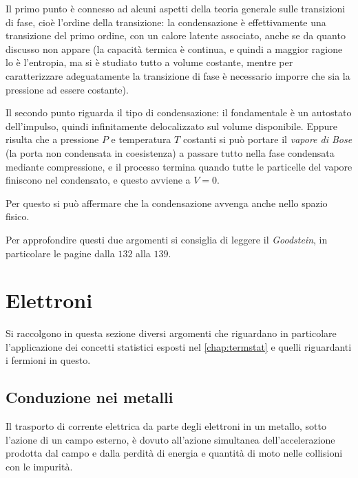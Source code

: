 Il primo punto è connesso ad alcuni aspetti della teoria generale sulle transizioni di fase, cioè l'ordine della transizione: la condensazione è effettivamente una transizione del primo ordine, con un calore latente associato, anche se da quanto discusso non appare (la capacità termica è continua, e quindi a maggior ragione lo è l'entropia, ma si è studiato tutto a volume costante, mentre per caratterizzare adeguatamente la transizione di fase è necessario imporre che sia la pressione ad essere costante).
\newline

Il secondo punto riguarda il tipo di condensazione: il fondamentale è un autostato dell'impulso, quindi infinitamente delocalizzato sul volume disponibile. Eppure risulta che a pressione $ P $ e temperatura $ T $ costanti si può portare il \textit{vapore di Bose} (la porta non condensata in coesistenza) a passare tutto nella fase condensata mediante compressione, e il processo termina quando tutte le particelle del vapore finiscono nel condensato, e questo avviene a $ V = 0 $.

Per questo si può affermare che la condensazione avvenga anche nello spazio fisico.


\begin{note}
	Per approfondire questi due argomenti si consiglia di leggere il \textit{Goodstein}, in particolare le pagine dalla $ 132 $ alla $ 139 $.
\end{note}

\section{Elettroni}

Si raccolgono in questa sezione diversi argomenti che riguardano in particolare l'applicazione dei concetti statistici esposti nel \cref{chap:termstat} e quelli riguardanti i fermioni in questo.

\subsection{Conduzione nei metalli}
\label{sec:elecconduct}

Il trasporto di corrente elettrica da parte degli elettroni in un metallo, sotto l'azione di un campo esterno, è dovuto all'azione simultanea dell'accelerazione prodotta dal campo e dalla perdità di energia e quantità di moto nelle collisioni con le impurità.

